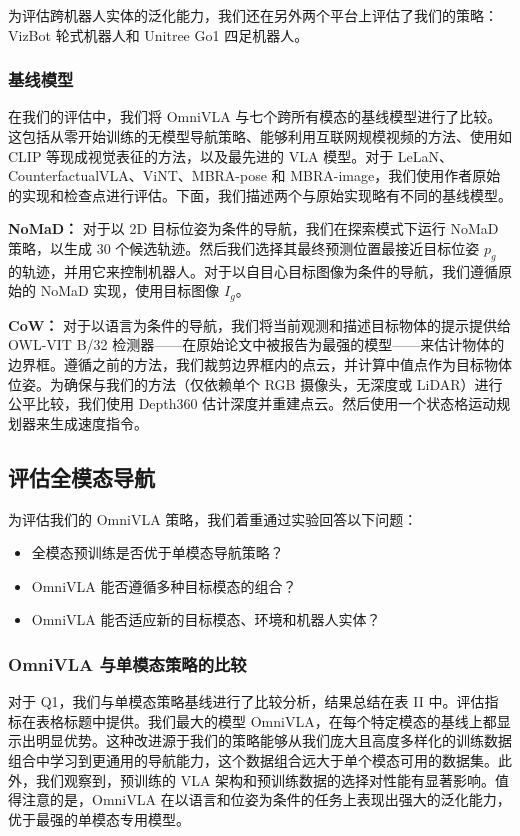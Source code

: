为评估跨机器人实体的泛化能力，我们还在另外两个平台上评估了我们的策略：VizBot 轮式机器人和 Unitree Go1 四足机器人。

\subsubsection{基线模型}

在我们的评估中，我们将 OmniVLA 与七个跨所有模态的基线模型进行了比较。这包括从零开始训练的无模型导航策略、能够利用互联网规模视频的方法、使用如 CLIP 等现成视觉表征的方法，以及最先进的 VLA 模型。对于 LeLaN、CounterfactualVLA、ViNT、MBRA-pose 和 MBRA-image，我们使用作者原始的实现和检查点进行评估。下面，我们描述两个与原始实现略有不同的基线模型。

\textbf{NoMaD：} 对于以 2D 目标位姿为条件的导航，我们在探索模式下运行 NoMaD 策略，以生成 30 个候选轨迹。然后我们选择其最终预测位置最接近目标位姿 $p_g$ 的轨迹，并用它来控制机器人。对于以自目心目标图像为条件的导航，我们遵循原始的 NoMaD 实现，使用目标图像 $I_g$。

\textbf{CoW：} 对于以语言为条件的导航，我们将当前观测和描述目标物体的提示提供给 OWL-VIT B/32 检测器——在原始论文中被报告为最强的模型——来估计物体的边界框。遵循之前的方法，我们裁剪边界框内的点云，并计算中值点作为目标物体位姿。为确保与我们的方法（仅依赖单个 RGB 摄像头，无深度或 LiDAR）进行公平比较，我们使用 Depth360 估计深度并重建点云。然后使用一个状态格运动规划器来生成速度指令。

\subsection{评估全模态导航}

为评估我们的 OmniVLA 策略，我们着重通过实验回答以下问题：

\begin{itemize}
    \item[\textbf{Q1}] 全模态预训练是否优于单模态导航策略？
    \item[\textbf{Q2}] OmniVLA 能否遵循多种目标模态的组合？
    \item[\textbf{Q3}] OmniVLA 能否适应新的目标模态、环境和机器人实体？
\end{itemize}

\subsubsection{OmniVLA 与单模态策略的比较}

对于 Q1，我们与单模态策略基线进行了比较分析，结果总结在表 II 中。评估指标在表格标题中提供。我们最大的模型 OmniVLA，在每个特定模态的基线上都显示出明显优势。这种改进源于我们的策略能够从我们庞大且高度多样化的训练数据组合中学习到更通用的导航能力，这个数据组合远大于单个模态可用的数据集。此外，我们观察到，预训练的 VLA 架构和预训练数据的选择对性能有显著影响。值得注意的是，OmniVLA 在以语言和位姿为条件的任务上表现出强大的泛化能力，优于最强的单模态专用模型。

